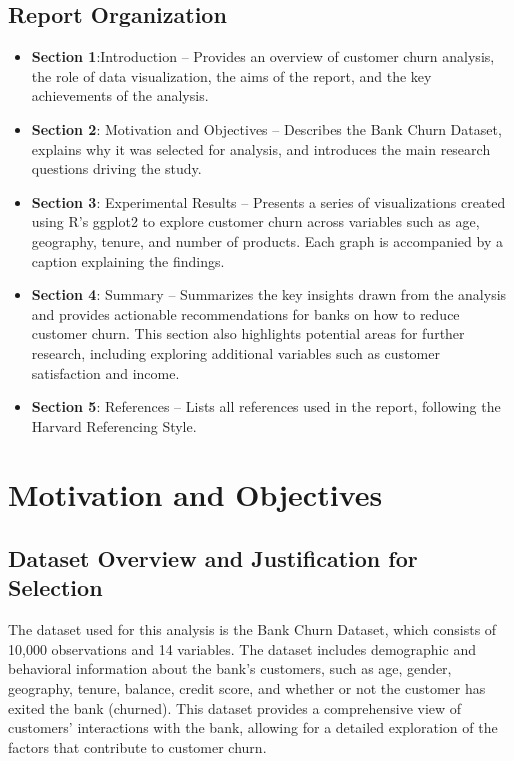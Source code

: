 \documentclass[12pt]{article}
\begin{document}
\subsection{Report Organization}
\begin{itemize}
    \item \textbf{Section 1}:Introduction – Provides an overview of customer churn analysis, the role of data visualization, the aims of the report, and the key achievements of the analysis.
    \item \textbf{Section 2}: Motivation and Objectives – Describes the Bank Churn Dataset, explains why it was selected for analysis, and introduces the main research questions driving the study.
    \item \textbf{Section 3}: Experimental Results – Presents a series of visualizations created using R’s ggplot2 to explore customer churn across variables such as age, geography, tenure, and number of products. Each graph is accompanied by a caption explaining the findings.
    \item \textbf{Section 4}:  Summary – Summarizes the key insights drawn from the analysis and provides actionable recommendations for banks on how to reduce customer churn. This section also highlights potential areas for further research, including exploring additional variables such as customer satisfaction and income.
    \item \textbf{Section 5}: References – Lists all references used in the report, following the Harvard Referencing Style.
\end{itemize}

\section{Motivation and Objectives}
\subsection{ Dataset Overview and Justification for Selection}
The dataset used for this analysis is the Bank Churn Dataset, which consists of 10,000 observations and 14 variables. The dataset includes demographic and behavioral information about the bank's customers, such as age, gender, geography, tenure, balance, credit score, and whether or not the customer has exited the bank (churned). This dataset provides a comprehensive view of customers' interactions with the bank, allowing for a detailed exploration of the factors that contribute to customer churn.
\end{document}
